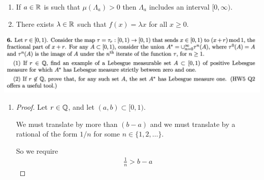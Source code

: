 \begin{enumerate}
\begin{proof}
    Note that for all $n \in \N$ we have $f(nx) = f(x + x + \cdots + x) = nf(x)$. Therefore
    \begin{align*}
      g_a(nx)
      &= f(nx) - anx \\
      &= n(f(x) - ax) \\
      &= ng_a(x).
    \end{align*}
    \begin{align*}
      g_a(x + x')
      &= f(x + x') - a(x + x') \\
      &= g_{a}(x) + g_{a}(x').
    \end{align*}
    Since $\mu(\Lambda_a) > 0$ there exist $x$ and $x'$ such that $g_a(x) \geq 0$ and $g_a(x') \geq 0$
    and $x \neq x'$.

    Therefore $g_a(x + x') \geq 0$.

    So what we need to do is show that some interval $[b, \infty)$ is ``spanned​'' by $x, x'$ values in $\Lambda_a$.



  \end{proof}

\item
  \begin{claim*}
    If $a \in \mathbb{R}$ is such that $\mu(\Lambda_a) > 0$ then $\Lambda_a$ includes an interval $[0, \infty)$.
  \end{claim*}

\item
  \begin{claim*}
    There exists $\lambda \in \mathbb{R}$ such that $f(x) = \lambda x$ for all $x \geq 0$.
  \end{claim*}


\end{enumerate}


\newpage
\begin{mdframed}
\includegraphics[width=400pt]{img/analysis--berkeley-202a-hw06-9bc5.png}
\end{mdframed}

\begin{enumerate}
\item
  \begin{proof}
    Let $r \in \mathbb{Q}$, and let $(a, b) \subset [0, 1)$.

    We must translate by more than $(b - a)$ and we must translate by a rational of the form $1/n$ for some $n \in \{1, 2, \ldots\}$.

    So we require
    \begin{align*}
      \frac{1}{n} > b - a
    \end{align*}
  \end{proof}
\end{enumerate}
